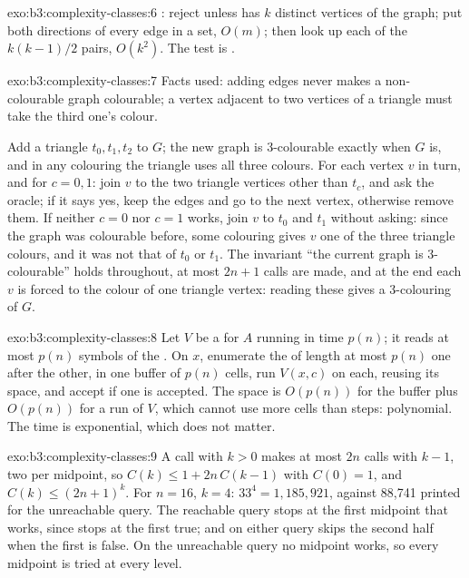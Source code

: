 \begin{solution}{exo:b3:complexity-classes:6}
: reject unless  has $k$ distinct vertices of the graph; put both directions of every edge in a set, $O(m)$; then look up each of the $k(k - 1)/2$ pairs, $O(k^2)$. The test is .
\end{solution}

\begin{solution}{exo:b3:complexity-classes:7}
Facts used: adding edges never makes a non-colourable graph colourable; a vertex adjacent to two vertices of a triangle must take the third one's colour.

Add a triangle $t_0, t_1, t_2$ to $G$; the new graph is 3-colourable exactly when $G$ is, and in any colouring the triangle uses all three colours. For each vertex $v$ in turn, and for $c = 0, 1$: join $v$ to the two triangle vertices other than $t_c$, and ask the oracle; if it says yes, keep the edges and go to the next vertex, otherwise remove them. If neither $c = 0$ nor $c = 1$ works, join $v$ to $t_0$ and $t_1$ without asking: since the graph was colourable before, some colouring gives $v$ one of the three triangle colours, and it was not that of $t_0$ or $t_1$. The invariant ``the current graph is 3-colourable'' holds throughout, at most $2n + 1$ calls are made, and at the end each $v$ is forced to the colour of one triangle vertex: reading these gives a 3-colouring of $G$.
\end{solution}

\begin{solution}{exo:b3:complexity-classes:8}
Let $V$ be a  for $A$ running in time $p(n)$; it reads at most $p(n)$ symbols of the . On $x$, enumerate the  of length at most $p(n)$ one after the other, in one buffer of $p(n)$ cells, run $V(x, c)$ on each, reusing its space, and accept if one is accepted. The space is $O(p(n))$ for the buffer plus $O(p(n))$ for a run of $V$, which cannot use more cells than steps: polynomial. The time is exponential, which does not matter.
\end{solution}

\begin{solution}{exo:b3:complexity-classes:9}
A call with $k > 0$ makes at most $2n$ calls with $k - 1$, two per midpoint, so $C(k) \le 1 + 2n\,C(k - 1)$ with $C(0) = 1$, and $C(k) \le (2n + 1)^k$. For $n = 16$, $k = 4$: $33^4 = 1{,}185{,}921$, against 88,741 printed for the unreachable query. The reachable query stops at the first midpoint that works, since  stops at the first true; and on either query  skips the second half when the first is false. On the unreachable query no midpoint works, so every midpoint is tried at every level.
\end{solution}

